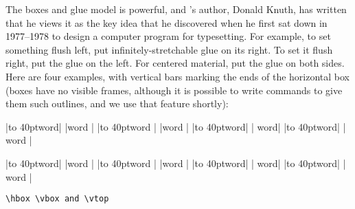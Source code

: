 The boxes and glue model is powerful, and \tex's author, Donald Knuth,
has written that he views it as the key idea that he discovered when he
first sat down in 1977--1978 to design a computer program for typesetting.
For example, to set something flush left, put infinitely-stretchable glue on
its right. To set it flush right, put the glue on the left. For centered material,
put the glue on both sides. Here are four examples, with vertical
bars marking the ends of the horizontal box (boxes have no visible frames,
although it is possible to write \tex commands to give them such outlines,
and we use that feature shortly):

\begin{teX}
|\hbox to 40pt{word}| |word |
|\hbox to 40pt{word \hfil}| |word |
|\hbox to 40pt{\hfil word}| | word|
|\hbox to 40pt{\hfil word\hfil}| | word |
\end{teX}

{\obeylines
|\hbox to 40pt{word}| |word |
|\hbox to 40pt{word \hfil}| |word |
|\hbox to 40pt{\hfil word}| | word|
|\hbox to 40pt{\hfil word\hfil}| | word |
}



\medskip

{\tt \protect\textbackslash hbox \protect\textbackslash vbox and \protect\textbackslash vtop}

